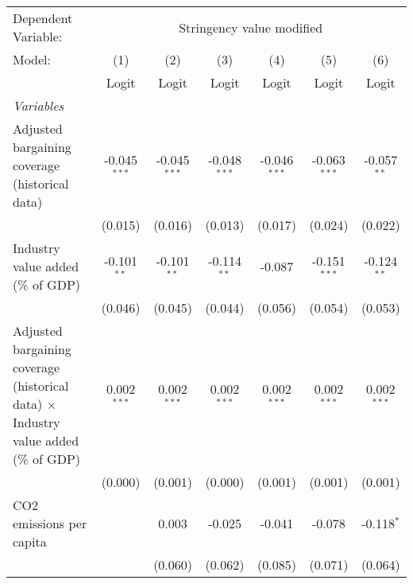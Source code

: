 
\begingroup
\centering
\begin{tabular}{lcccccc}
   \toprule
   Dependent Variable: & \multicolumn{6}{c}{Stringency value modified}\\
   Model:                                                                                     & (1)            & (2)            & (3)            & (4)            & (5)            & (6)\\  
                                                                                              &  Logit         & Logit          & Logit          & Logit          & Logit          & Logit\\  
   \midrule
   \emph{Variables}\\
   Adjusted bargaining coverage (historical data)                                             & -0.045$^{***}$ & -0.045$^{***}$ & -0.048$^{***}$ & -0.046$^{***}$ & -0.063$^{***}$ & -0.057$^{**}$\\   
                                                                                              & (0.015)        & (0.016)        & (0.013)        & (0.017)        & (0.024)        & (0.022)\\   
   Industry value added (\% of GDP)                                                           & -0.101$^{**}$  & -0.101$^{**}$  & -0.114$^{**}$  & -0.087         & -0.151$^{***}$ & -0.124$^{**}$\\   
                                                                                              & (0.046)        & (0.045)        & (0.044)        & (0.056)        & (0.054)        & (0.053)\\   
   Adjusted bargaining coverage (historical data) $\times$ Industry value added (\% of GDP)   & 0.002$^{***}$  & 0.002$^{***}$  & 0.002$^{***}$  & 0.002$^{***}$  & 0.002$^{***}$  & 0.002$^{***}$\\   
                                                                                              & (0.000)        & (0.001)        & (0.000)        & (0.001)        & (0.001)        & (0.001)\\   
   CO2 emissions per capita                                                                   &                & 0.003          & -0.025         & -0.041         & -0.078         & -0.118$^{*}$\\   
                                                                                              &                & (0.060)        & (0.062)        & (0.085)        & (0.071)        & (0.064)\\   

\end{tabular}
